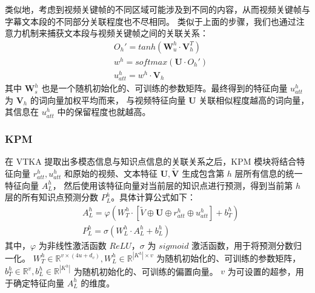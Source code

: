    类似地，考虑到视频关键帧的不同区域可能涉及到不同的内容，从而视频关键帧与字幕文本段的不同部分关联程度也不尽相同。
    类似于上面的步骤，我们也通过注意力机制来捕获文本段与视频关键帧之间的关联关系：
    \begin{equation}
        \begin{aligned}
            &O_h' = tanh\left(\boldsymbol{W}_u^h \cdot \boldsymbol{V}_h^T\right) \\
            &w^h = softmax\left(\boldsymbol{U} \cdot O_h'\right) \\
            &u_{att}^h = w^h \cdot \boldsymbol{V}_h
        \end{aligned}
    \end{equation}
    其中 $\boldsymbol{W}_s^h$ 也是一个随机初始化的、可训练的参数矩阵。最终得到的特征向量 $u_{att}^h$ 为 $\boldsymbol{V}_h$ 的词向量加权平均而来，
    与视频特征向量 $\boldsymbol{U}$ 关联相似程度越高的词向量，其信息在 $u_{att}^h$ 中的保留程度也就越高。

    \subsubsection{KPM}
    在 VTKA 提取出多模态信息与知识点信息的关联关系之后，KPM 模块将结合特征向量 $r_{att}^h, u_{att}^h$ 和原始的视频、文本特征 $\boldsymbol{U}, \boldsymbol{\tilde{V}}$ 生成包含第 $h$ 层所有信息的统一特征向量 $A_L^h$，
    然后使用该特征向量对当前层的知识点进行预测，得到当前第 $h$ 层的所有知识点预测分数 $P_L^h$。具体计算公式如下：
    \begin{equation}
        \begin{aligned}
        &A_L^h = \varphi\left(W_T^h \cdot \left[\tilde{V} \oplus \boldsymbol{U} \oplus r_{att}^h \oplus u_{att}^h\right] + b_T^h\right) \\
        &P_L^h = \sigma\left(W_L^h \cdot A_L^h + b_L^h\right)
        \end{aligned}
    \end{equation}
    其中，$\varphi$ 为非线性激活函数 $ReLU$，$\sigma$ 为 $sigmoid$ 激活函数，用于将预测分数归一化。
    $W_T^h \in \mathbb{R}^{v \times (4u + d_v)}, W_L^h \in \mathbb{R}^{{\left|K^h\right|} \times v}$ 为随机初始化的、可训练的参数矩阵，
    $b_T^h \in \mathbb{R}^{v}, b_L^h \in \mathbb{R}^{\left|K^h\right|}$ 为随机初始化的、可训练的偏置向量。
    $v$ 为可设置的超参，用于确定特征向量 $A_L^h$ 的维度。

